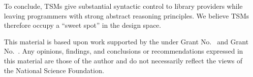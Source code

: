 \documentclass[acmlarge,review,anonymous]{acmart}\settopmatter{printfolios=true}
\begin{document}
To conclude, TSMs give substantial syntactic control to library providers while leaving programmers with strong abstract reasoning principles. We believe TSMs therefore occupy a ``sweet spot'' in the  design space. %





\begin{acks}                            %
  This material is based upon work supported by the
   under Grant
  No.~ and Grant
  No.~.  Any opinions, findings, and
  conclusions or recommendations expressed in this material are those
  of the author and do not necessarily reflect the views of the
  National Science Foundation.
\end{acks}



\end{document}
